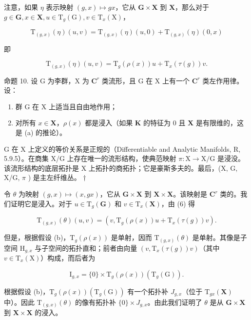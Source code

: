 注意，如果 \(\eta\) 表示映射 \((g,x)\mapsto gx\)，它从 \(\mathbf{G}\times \mathbf{X}\) 到 \(\mathbf{X}\)，那么对于 \(g\in \mathbf{G},x\in \mathbf{X},u\in \mathrm{T}_g(\mathrm{G}),v\in \mathrm{T}_x(\mathrm{X})\)，

\[
\mathrm{T} _ {(g, x)} (\eta) (u, v) = \mathrm{T} _ {(g, x)} (\eta) (u, 0) + \mathrm{T} _ {(g, x)} (\eta) (0, x)
\]

即

\[
\mathrm{T} _ {(g, x)} (\eta) (u, v) = \mathrm{T} _ {g} (\rho (x)) u + \mathrm{T} _ {x} (\tau (g)) v.\tag{6}
\]

命题 10. 设 G 为李群，X 为 \(\mathbf{C}^r\) 类流形，且 G 在 X 上有一个 \(\mathbf{C}^r\) 类左作用律。设：

\begin{enumerate}
\def\labelenumi{(\alph{enumi})}
\item
  群 G 在 X 上适当且自由地作用；
\item
  对所有 \(x \in \mathbf{X}\)，\(\rho(x)\) 都是浸入（如果 \(\mathbf{K}\) 的特征为 0 且 \(\mathbf{X}\) 是有限维的，这是 (a) 的推论）。
\end{enumerate}

G 在 X 上定义的等价关系是正规的（Differentiable and Analytic Manifolds, R, 5.9.5）。在商集 X/G 上存在唯一的流形结构，使典范映射 \(\pi: \mathrm{X} \to \mathrm{X} / \mathrm{G}\) 是浸没。该流形结构的底层拓扑是 X 上拓扑的商拓扑；它是豪斯多夫的。最后，(X, G, X/G, \(\pi\) ) 是主左纤维丛。 \(\dagger\)

令 \(\theta\) 为映射 \((g, x) \mapsto (x, gx)\)，它从 \(\mathbf{G} \times \mathbf{X}\) 到 \(\mathbf{X} \times \mathbf{X}\)。该映射是 \(\mathbf{C}^r\) 类的。我们证明它是浸入。对于 \(u \in \mathrm{T}_g(\mathbf{G})\) 和 \(v \in \mathrm{T}_x(\mathbf{X})\)，由 (6) 得

\[
\mathrm{T} _ {(g, x)} (\theta) (u, v) = (v, \mathrm{T} _ {g} (\rho (x)) u + \mathrm{T} _ {x} (\tau (g)) v).\tag{7}
\]

但是，根据假设 (b)，\(\mathrm{T}_{g}(\rho(x))\) 是单射，因而 \(\mathrm{T}_{(g,x)}(\theta)\) 是单射。其像是子空间 \(\mathrm{H}_{g,x}\) 与子空间的拓扑直和；前者由向量 \((v,\mathrm{T}_x(\tau(g))v)\)（其中 \(v\in \mathrm{T}_x(\mathrm{X})\)）构成，而后者为

\[
\mathrm{I} _ {g, x} = \{0 \} \times \mathrm{T} _ {g} (\rho (x)) (\mathrm{T} _ {g} (\mathrm{G})).
\]

根据假设 (b)，\(\mathrm{T}_g(\rho(x))(\mathrm{T}_g(\mathrm{G}))\) 有一个拓扑补 \(J_{g,x}\)（位于 \(\mathrm{T}_{gx}(\mathbf{X})\) 中）。因此 \(\mathrm{T}_{(g,x)}(\theta)\) 的像有拓扑补 \(\{0\} \times J_{g,x}\)。由此我们证明了 \(\theta\) 是从 \(\mathbf{G} \times \mathbf{X}\) 到 \(\mathbf{X} \times \mathbf{X}\) 的浸入。

